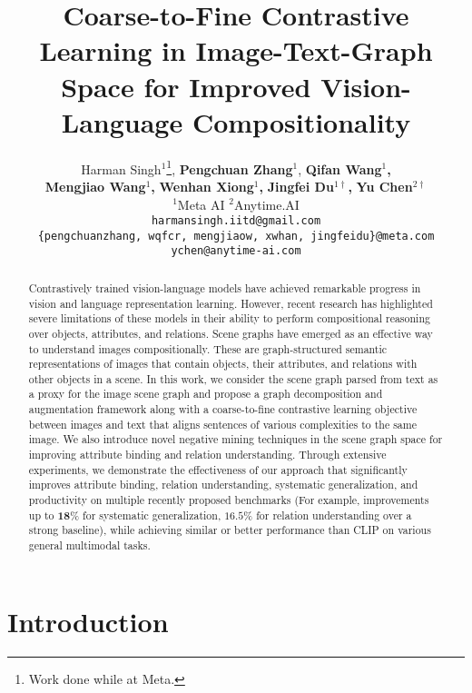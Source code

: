 \documentclass[11pt]{article}
\title{Coarse-to-Fine Contrastive Learning in Image-Text-Graph Space for Improved Vision-Language Compositionality}
\author{
    Harman Singh$^{1}$\thanks{\hspace{0.3em} Work done while at Meta.}\hspace{0.3em},  
    \textbf{Pengchuan Zhang}$^{1}$,
    \textbf{Qifan Wang}$^{1}$\textbf{,} \\
    \textbf{Mengjiao Wang}$^{1}$\textbf{,}
    \textbf{Wenhan Xiong}$^{1}$\textbf{,}
    \textbf{Jingfei Du}$^{1\dagger}$\textbf{,}
    \textbf{Yu Chen}$^{2\dagger}$
    \\
    $^{1}$Meta AI \quad
    $^{2}$Anytime.AI\\
    \texttt{harmansingh.iitd@gmail.com} \\
    \texttt{\{pengchuanzhang, wqfcr, mengjiaow, xwhan, jingfeidu\}@meta.com} \\
    \texttt{ychen@anytime-ai.com}
}
\begin{document}
\maketitle

\newcommand{\Lcal}{\mathcal{L}}
\newcommand{\Bcal}{\mathcal{B}}
\newcommand{\Pcal}{\mathcal{P}}
\newcommand{\Ucal}{\mathcal{U}}
\newcommand{\Vcal}{\mathcal{V}}
\newcommand{\Ecal}{\mathcal{E}}
\newcommand{\Dcal}{\mathcal{D}}
\newcommand{\Ical}{\mathcal{I}}
\newcommand{\Tcal}{\mathcal{T}}
\newcommand{\Xcal}{\mathcal{X}}
\newcommand{\Gcal}{\mathcal{G}}
\newcommand{\uv}{\boldsymbol{u}}
\newcommand{\vv}{\boldsymbol{v}}
\newcommand{\xv}{\boldsymbol{x}}
\newcommand{\tv}{\boldsymbol{t}}
\newcommand{\gv}{\boldsymbol{g}}

\begin{abstract}
Contrastively trained vision-language models have achieved remarkable progress in vision and language representation learning. However, recent research has highlighted severe limitations of these models in their ability to perform compositional reasoning over objects, attributes, and relations. Scene graphs have emerged as an effective way to understand images compositionally. These are graph-structured semantic representations of images that contain objects, their attributes, and relations with other objects in a scene. In this work, we consider the scene graph parsed from text as a proxy for the image scene graph and propose a graph decomposition and augmentation framework along with a coarse-to-fine contrastive learning objective between images and text that aligns sentences of various complexities to the same image. We also introduce novel negative mining techniques in the scene graph space for improving attribute binding and relation understanding. Through extensive experiments, we demonstrate the effectiveness of our approach that significantly improves attribute binding, relation understanding, systematic generalization, and productivity on multiple recently proposed benchmarks (For example, improvements 
up to $\mathbf{18\%}$ for systematic generalization, $\mathbf{16.5\%}$ for relation understanding over a strong baseline), while achieving similar or better performance than CLIP on various general multimodal tasks.

\end{abstract} \section{Introduction}
\end{document}
